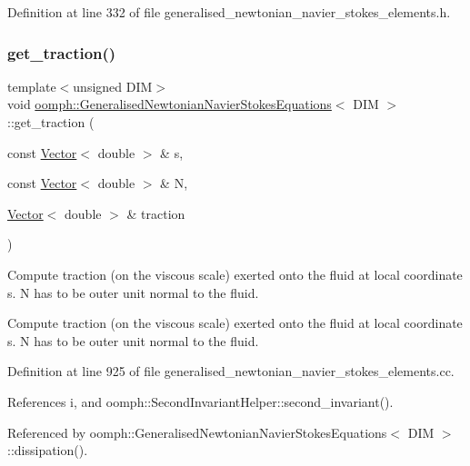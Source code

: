 Definition at line 332 of file generalised\+\_\+newtonian\+\_\+navier\+\_\+stokes\+\_\+elements.\+h.

\mbox{\label{classoomph_1_1GeneralisedNewtonianNavierStokesEquations_a27a320f14e11c9d1574073e447558946}} 
\subsubsection{\texorpdfstring{get\+\_\+traction()}{get\_traction()}\hspace{0.1cm}{\footnotesize\ttfamily [1/2]}}
{\footnotesize\ttfamily template$<$unsigned D\+IM$>$ \\
void \hyperlink{classoomph_1_1GeneralisedNewtonianNavierStokesEquations}{oomph\+::\+Generalised\+Newtonian\+Navier\+Stokes\+Equations}$<$ D\+IM $>$\+::get\+\_\+traction (\begin{DoxyParamCaption}\item[{const \hyperlink{classoomph_1_1Vector}{Vector}$<$ double $>$ \&}]{s,  }\item[{const \hyperlink{classoomph_1_1Vector}{Vector}$<$ double $>$ \&}]{N,  }\item[{\hyperlink{classoomph_1_1Vector}{Vector}$<$ double $>$ \&}]{traction }\end{DoxyParamCaption})}



Compute traction (on the viscous scale) exerted onto the fluid at local coordinate s. N has to be outer unit normal to the fluid. 

Compute traction (on the viscous scale) exerted onto the fluid at local coordinate s. N has to be outer unit normal to the fluid. 

Definition at line 925 of file generalised\+\_\+newtonian\+\_\+navier\+\_\+stokes\+\_\+elements.\+cc.



References i, and oomph\+::\+Second\+Invariant\+Helper\+::second\+\_\+invariant().



Referenced by oomph\+::\+Generalised\+Newtonian\+Navier\+Stokes\+Equations$<$ D\+I\+M $>$\+::dissipation().

